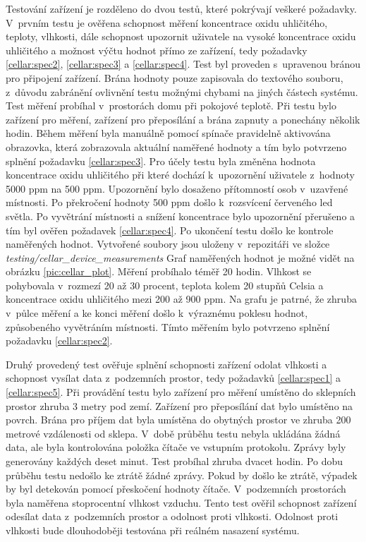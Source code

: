 Testování zařízení je rozděleno do dvou testů, které pokrývají veškeré požadavky. V~prvním testu je ověřena schopnost měření koncentrace oxidu uhličitého, teploty, vlhkosti, dále schopnost upozornit  uživatele na vysoké koncentrace oxidu uhličitého a možnost výčtu hodnot přímo ze zařízení, tedy požadavky \ref{cellar:spec2}, \ref{cellar:spec3} a \ref{cellar:spec4}. Test byl proveden s~upravenou bránou pro připojení zařízení. Brána hodnoty pouze zapisovala do textového souboru, z~důvodu zabránění ovlivnění testu možnými chybami na jiných částech systému. Test měření probíhal v~prostorách domu při pokojové teplotě. Při testu bylo zařízení pro měření, zařízení pro přeposílání a brána zapnuty a ponechány několik hodin. Během měření byla manuálně pomocí spínače pravidelně aktivována obrazovka, která zobrazovala aktuální naměřené hodnoty a tím bylo potvrzeno splnění požadavku \ref{cellar:spec3}. Pro účely testu byla změněna hodnota koncentrace oxidu uhličitého při které dochází k~upozornění uživatele z~hodnoty 5000 ppm na 500 ppm. Upozornění bylo dosaženo přítomností osob v~uzavřené místnosti. Po překročení hodnoty 500 ppm došlo k~rozsvícení červeného led světla. Po vyvětrání místnosti a snížení koncentrace bylo upozornění přerušeno a tím byl ověřen požadavek \ref{cellar:spec4}. Po ukončení testu došlo ke kontrole naměřených hodnot. Vytvořené soubory jsou uloženy v~repozitáři ve složce \textit{testing/cellar\_device\_measurements} Graf naměřených hodnot je možné vidět na obrázku \ref{pic:cellar_plot}. Měření probíhalo téměř 20 hodin. Vlhkost se pohybovala v~rozmezí 20 až 30 procent, teplota kolem 20 stupňů Celsia a koncentrace oxidu uhličitého mezi 200 až 900 ppm. Na grafu je patrné, že zhruba v~půlce měření a ke konci měření došlo k~výraznému poklesu hodnot, způsobeného vyvětráním místnosti. Tímto měřením bylo potvrzeno splnění požadavku \ref{cellar:spec2}.

Druhý provedený test ověřuje splnění schopnosti zařízení odolat vlhkosti a schopnost vysílat data z~podzemních prostor, tedy požadavků \ref{cellar:spec1} a \ref{cellar:spec5}. Při provádění testu bylo zařízení pro měření umístěno do sklepních prostor zhruba 3 metry pod zemí. Zařízení pro přeposílání dat bylo umístěno na povrch. Brána pro příjem dat byla umístěna do obytných prostor ve zhruba 200 metrové vzdálenosti od sklepa. V~době průběhu testu nebyla ukládána žádná data, ale byla kontrolována položka čítače ve vstupním protokolu. Zprávy byly generovány každých deset minut. Test probíhal zhruba dvacet hodin. Po dobu průběhu testu nedošlo ke ztrátě žádné zprávy. Pokud by došlo ke ztrátě, výpadek by byl detekován pomocí přeskočení hodnoty čítače. V~podzemních prostorách byla naměřena stoprocentní vlhkost vzduchu. Tento test ověřil schopnost zařízení odesílat data z~podzemních prostor a odolnost proti vlhkosti. Odolnost proti vlhkosti bude dlouhodoběji testována při reálném nasazení systému.


